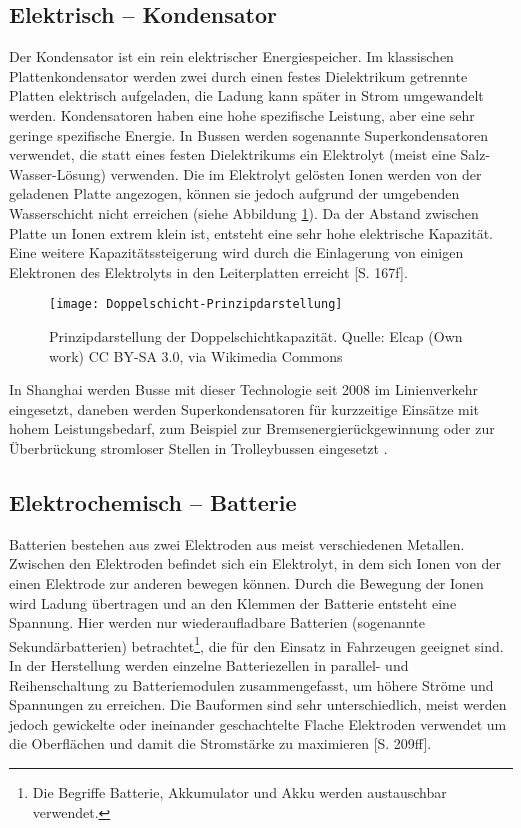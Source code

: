 \subsection{Elektrisch – Kondensator}
Der Kondensator ist ein rein elektrischer Energiespeicher. Im klassischen Plattenkondensator werden zwei durch einen festes Dielektrikum getrennte Platten elektrisch aufgeladen, die Ladung kann später in Strom umgewandelt werden. Kondensatoren haben eine hohe spezifische Leistung, aber eine sehr geringe spezifische Energie. In Bussen werden sogenannte Superkondensatoren verwendet, die statt eines festen Dielektrikums ein Elektrolyt (meist eine Salz-Wasser-Lösung) verwenden. Die im Elektrolyt gelösten Ionen werden von der geladenen Platte angezogen, können sie jedoch aufgrund der umgebenden Wasserschicht nicht erreichen (siehe Abbildung \ref{abb_doppelschicht}). Da der Abstand zwischen Platte un Ionen extrem klein ist, entsteht eine sehr hohe elektrische Kapazität. Eine weitere Kapazitätssteigerung wird durch die Einlagerung von einigen Elektronen des Elektrolyts in den Leiterplatten erreicht \cite{Sterner:2014}[S. 167f].

\begin{figure}\centering
	 \texttt{[image: Doppelschicht-Prinzipdarstellung]}
	 \caption{Prinzipdarstellung der Doppelschichtkapazität. Quelle: Elcap (Own work) CC BY-SA 3.0, via Wikimedia Commons}
	 \label{abb_doppelschicht}
\end{figure}

In Shanghai werden Busse mit dieser Technologie seit 2008 im Linienverkehr eingesetzt, daneben werden Superkondensatoren für kurzzeitige Einsätze mit hohem Leistungsbedarf, zum Beispiel zur Bremsenergierückgewinnung oder zur Überbrückung stromloser Stellen in Trolleybussen eingesetzt \cite{Barminer-Busgesellschaft:2012}.

\subsection{Elektrochemisch – Batterie} %
Batterien bestehen aus zwei Elektroden aus meist verschiedenen Metallen. Zwischen den Elektroden befindet sich ein Elektrolyt, in dem sich Ionen von der einen Elektrode zur anderen bewegen können. Durch die Bewegung der Ionen wird Ladung übertragen und an den Klemmen der Batterie entsteht eine Spannung. Hier werden nur wiederaufladbare Batterien (sogenannte Sekundärbatterien) betrachtet\footnote{Die Begriffe Batterie, Akkumulator und Akku werden austauschbar verwendet.}, die für den Einsatz in Fahrzeugen geeignet sind. In der Herstellung werden einzelne Batteriezellen in parallel- und Reihenschaltung zu Batteriemodulen zusammengefasst, um höhere Ströme und Spannungen zu erreichen. Die Bauformen sind sehr unterschiedlich, meist werden jedoch gewickelte oder ineinander geschachtelte Flache Elektroden verwendet um die Oberflächen und damit die Stromstärke zu maximieren \cite{Sterner:2014}[S. 209ff].


